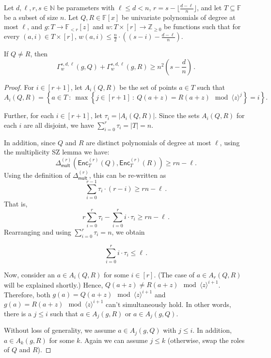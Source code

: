 \documentclass{theoretics}
\def\Integer{\mathbb{Z}}
\def\Natural{\mathbb{N}}
\def\Field{\mathbb{F}}
\let\N\Natural
\let\Z\Integer
\let\F\Field
\def\abs#1{\left| #1 \right|}
\def\inbrace#1{\left\{ #1 \right\}}
\def\setdef#1#2{\inbrace{ #1 \ \colon \ #2}}      %
\newcommand{\enc}{{\mathsf{Enc}}}
\newcommand{\Delm}{\Delta_{\mathsf{mult}}}
\begin{document}
	\begin{lemma}\label{lem: gamma triangle}
		Let $d, \ell,r,s \in \N$ be parameters with $\ell \leq d < n$, $r =  s -
		\lfloor \frac{d-\ell}{n} \rfloor $, and let $T \subseteq \F$ be a
		subset of size $n$. Let $Q, R \in \F[x]$ be univariate polynomials of
		degree at most $\ell$, and $g\colon T \to \F_{<r}[z]$ and $w\colon T
		\times [r] \to \Z_{\geq 0}$ be functions such that for every $(a, i)
		\in T \times [r]$, $w(a,i) \leq \frac{n}{2}\cdot \left((s-i) - \frac{d-\ell}{n}\right)$. 
		
		If $Q \neq R$, then 
		\[
		\Gamma_w^{s,d,\ell}(g, Q) + \Gamma_w^{s,d,\ell}(g, R) \geq n^2\left(s - \frac{d}n\right) \, .
		\]
		
	\end{lemma}
	\begin{proof}
		For $i\in[r+1]$, let $A_i(Q,R)$ be the set of points $a \in T$ such that
		\[
		A_i(Q,R)=\setdef{a\in T}{\max{\setdef{j\in [r+1]}{Q(a+z)=R(a+z) \mod \langle z\rangle ^{j}}}=i}.
		\]
		
		Further, for each $i \in [r+1]$, let $\tau_i = \abs{A_i(Q, R)}$. Since the sets $A_i(Q, R)$ for each $i$ are all disjoint, we have $\sum_{i=0}^r \tau_i = \abs{T} = n$. 
		
		In addition, since $Q$ and $R$ are distinct polynomials of degree at most $\ell$, using the multiplicity SZ lemma we have:
		\[
		\Delm^{(r)} (\enc^{(r)}_T(Q), \enc^{(r)}_T(R)) \geq rn-\ell.
		\]
		Using the definition of $\Delm^{(r)}$, this can be re-written as 
		\[
		\sum_{i=0}^{r-1}  \tau_i \cdot (r-i) \geq rn-\ell \, .
		\]
		That is,
		\[ r \sum_{i=0}^{r} {\tau_i} - \sum_{i=0}^{r} i \cdot {\tau_i}  \geq rn-\ell \, .
		\]
		Rearranging and using $\sum_{i=0}^{r} \tau_i = n$, we obtain 
		
		\[ 
		\sum_{i=0}^{r} i \cdot \tau_i \leq \ell \, .
		\] 
		
		Now, consider an $a \in A_i(Q, R)$ for some $i\in [r]$. (The case of $a \in A_r(Q, R)$ will be explained shortly.) Hence, $Q(a+z)\neq R(a+z)\mod \langle z\rangle^{i+1}$. Therefore, both $g(a)=Q(a+z) \mod \langle z \rangle^{i+1}$ and $g(a)= R(a+z)\mod \langle z\rangle^{i+1}$ can't simultaneously hold. In other words, there is a $j \leq i$ such that $a \in A_j(g,R)$ or $a\in A_j(g,Q)$.
		
		Without loss of generality, we assume $a \in A_j(g, Q)$ with $j \leq i$. In addition, $a \in A_k(g, R)$ for some $k$. Again we can assume $j \leq k$ (otherwise, swap the roles of $Q$ and $R$).
		

\end{proof}
\end{document}
